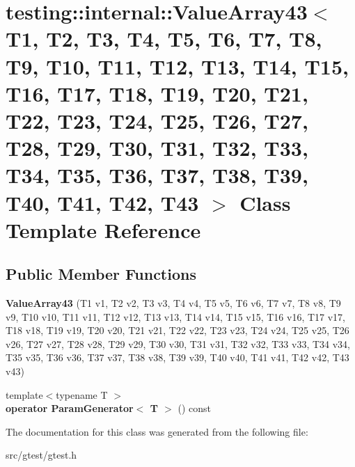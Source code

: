 \hypertarget{classtesting_1_1internal_1_1_value_array43}{}\section{testing\+:\+:internal\+:\+:Value\+Array43$<$ T1, T2, T3, T4, T5, T6, T7, T8, T9, T10, T11, T12, T13, T14, T15, T16, T17, T18, T19, T20, T21, T22, T23, T24, T25, T26, T27, T28, T29, T30, T31, T32, T33, T34, T35, T36, T37, T38, T39, T40, T41, T42, T43 $>$ Class Template Reference}
\label{classtesting_1_1internal_1_1_value_array43}
\subsection*{Public Member Functions}
\begin{DoxyCompactItemize}
\item 
\mbox{\label{classtesting_1_1internal_1_1_value_array43_a130b80e3ff71d23687461a46cc9d2ba3}} 
{\bfseries Value\+Array43} (T1 v1, T2 v2, T3 v3, T4 v4, T5 v5, T6 v6, T7 v7, T8 v8, T9 v9, T10 v10, T11 v11, T12 v12, T13 v13, T14 v14, T15 v15, T16 v16, T17 v17, T18 v18, T19 v19, T20 v20, T21 v21, T22 v22, T23 v23, T24 v24, T25 v25, T26 v26, T27 v27, T28 v28, T29 v29, T30 v30, T31 v31, T32 v32, T33 v33, T34 v34, T35 v35, T36 v36, T37 v37, T38 v38, T39 v39, T40 v40, T41 v41, T42 v42, T43 v43)
\item 
\mbox{\label{classtesting_1_1internal_1_1_value_array43_a5972142ac740aaab964aa1b5d7fc472c}} 
{\footnotesize template$<$typename T $>$ }\\{\bfseries operator Param\+Generator$<$ T $>$} () const
\end{DoxyCompactItemize}


The documentation for this class was generated from the following file\+:\begin{DoxyCompactItemize}
\item 
src/gtest/gtest.\+h\end{DoxyCompactItemize}
